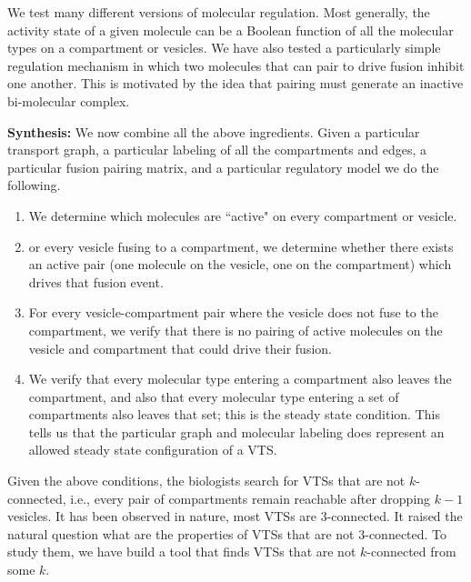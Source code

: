 We test many different versions of molecular
regulation.
%
Most generally, the activity state of a given molecule can be a
Boolean function of all the molecular types on a compartment or vesicles.
We have also tested a particularly simple regulation mechanism in which two
molecules that can pair to drive fusion inhibit one another.
%
This is motivated by the idea that pairing must generate an inactive
bi-molecular complex.

\textbf{Synthesis:} We now combine all the above ingredients.
%
Given a particular
transport graph, a particular labeling of all the compartments and edges,
a particular fusion pairing matrix, and a particular regulatory model we do
the following.
\begin{enumerate}
\item We determine which molecules are ``active" on every
compartment or vesicle.
\item or every vesicle fusing to a compartment, we
determine whether there exists an active pair (one molecule on the vesicle,
one on the compartment) which drives that fusion event.
\item For every vesicle-compartment pair where the vesicle does not fuse to the
compartment, we verify that there is no pairing of active molecules on the
vesicle and compartment that could drive their fusion.
\item We verify that every molecular type entering a compartment also leaves the compartment,
and also that every molecular type entering a set of compartments also
leaves that set; this is the steady state condition.
%
This tells us that the
particular graph and molecular labeling does represent an allowed steady
state configuration of a VTS.
\end{enumerate}

Given the above conditions, the biologists search for VTSs that are
not $k$-connected, i.e., every pair of compartments remain reachable
after dropping $k-1$ vesicles.
%
It has been observed in nature, most VTSs are 3-connected.
%
It raised the natural question what are the properties of VTSs
that are not 3-connected.
%
To study them, we have build a tool that finds VTSs that are not
$k$-connected from some $k$.





